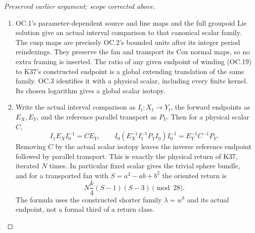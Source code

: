 \begin{proof}[Preserved earlier argument; scope corrected above]
\begin{enumerate}[label=\arabic*.]
\par

\medskip\noindent\textbf{OC.5. The actual interval comparison and physical return}

\par\nobreak

\item OC.1's parameter-dependent source and line maps and the full
groupoid Lie solution give an actual interval comparison to that
canonical scalar family. The cusp maps are precisely OC.2's bounded
units after its integer period reindexings. They preserve the fan
and transport its Cox normal maps, so no extra framing is inserted.
The ratio of any given endpoint of winding (OC.19) to K37's
constructed endpoint is a global extending translation of the same
family. OC.3 identifies it with a physical scalar, including every
finite kernel. Its chosen logarithm gives a global scalar isotopy.

\item Write the actual interval comparison as \(I_t:X_t\to Y_t\),
the forward endpoints as \(E_X,E_Y\), and the reference parallel
transport as \(P_Y\). Then for a physical scalar \(C\),
\[
 I_1E_XI_0^{-1}=C E_Y,\qquad
 I_0(E_X^{-1}I_1^{-1}P_YI_0)I_0^{-1}
                  =E_Y^{-1}C^{-1}P_Y.                   \tag{OC.21}
\]
Removing \(C\) by the actual scalar isotopy leaves the inverse
reference endpoint followed by parallel transport. This is exactly
the physical return of K37, iterated \(N\) times. In particular
fixed scalar gives the trivial sphere bundle, and for a transported
fan with \(S=a^2-ab+b^2\) the oriented return is
\[
                    N\frac{k}{4}(S-1)(S-3)\pmod{28}.     \tag{OC.22}
\]
The formula uses the constructed shorter family \(\lambda=w^k\)
and its actual endpoint, not a formal third of a return class.

\end{enumerate}
\end{proof}